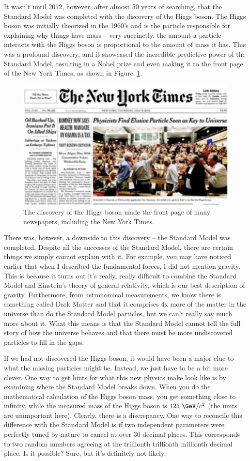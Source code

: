 It wasn't until 2012, however, after almost 50 years of searching, that the Standard Model was completed with the discovery of the Higgs boson.
The Higgs boson was initially theorized in the 1960's and is the particle responsible for explaining why things have mass -- very succinctly, the amount a particle interacts with the Higgs boson is proportional to the amount of mass it has.
This was a profound discovery, and it showcased the incredible predictive power of the Standard Model, resulting in a Nobel prize and even making it to the front page of the New York Times, as shown in Figure~\ref{fig:nyt_higgs}.

\begin{figure}[tbp!]
\begin{center}
\includegraphics[angle=0,width=0.60\columnwidth]{fig/nyt_higgs.pdf}
\end{center}
\caption{The discovery of the Higgs boson made the front page of many newspapers, including the New York Times.}
\label{fig:nyt_higgs}
\end{figure}

There was, however, a downside to this discovery -- the Standard Model was completed.
Despite all the successes of the Standard Model, there are certain things we simply cannot explain with it.
For example, you may have noticed earlier that when I described the fundamental forces, I did not mention gravity.
This is because it turns out it's really, really difficult to combine the Standard Model and Einstein's theory of general relativity, which is our best description of gravity.
Furthermore, from astronomical measurements, we know there is something called Dark Matter and that it comprises 4x more of the matter in the universe than do the Standard Model particles, but we can't really say much more about it.
What this means is that the Standard Model cannot tell the full story of how the universe behaves and that there must be more undiscovered particles to fill in the gaps.

If we had not discovered the Higgs boson, it would have been a major clue to what the missing particles might be. 
Instead, we just have to be a bit more clever.
One way to get hints for what this new physics make look like is by examining where the Standard Model breaks down.
When you do the mathematical calculation of the Higgs boson mass, you get something close to infinity, while the measured mass of the Higgs boson is $125~\GeV/c^2$ (the units are unimportant here).
Clearly, there is a discrepancy.
One way to reconcile this difference with the Standard Model is if two independent parameters were perfectly tuned by nature to cancel at over 30 decimal places.
This corresponds to two random numbers agreeing at the trillionth trillionth millionth decimal place.
Is it possible? 
Sure, but it's definitely not likely.

